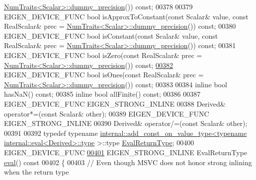 \begin{DoxyCode}
      \hyperlink{group___core___module_struct_eigen_1_1_num_traits}{NumTraits<Scalar>::dummy\_precision}()) \textcolor{keyword}{const};
00378 
00379     EIGEN\_DEVICE\_FUNC \textcolor{keywordtype}{bool} isApproxToConstant(\textcolor{keyword}{const} Scalar& value, \textcolor{keyword}{const} RealScalar& prec = 
      \hyperlink{group___core___module_struct_eigen_1_1_num_traits}{NumTraits<Scalar>::dummy\_precision}()) \textcolor{keyword}{const};
00380     EIGEN\_DEVICE\_FUNC \textcolor{keywordtype}{bool} isConstant(\textcolor{keyword}{const} Scalar& value, \textcolor{keyword}{const} RealScalar& prec = 
      \hyperlink{group___core___module_struct_eigen_1_1_num_traits}{NumTraits<Scalar>::dummy\_precision}()) \textcolor{keyword}{const};
00381     EIGEN\_DEVICE\_FUNC \textcolor{keywordtype}{bool} isZero(\textcolor{keyword}{const} RealScalar& prec = 
      \hyperlink{group___core___module_struct_eigen_1_1_num_traits}{NumTraits<Scalar>::dummy\_precision}()) \textcolor{keyword}{const};
\hyperlink{group___core___module_a8594e26025b86a531561a2476400eed1}{00382}     EIGEN\_DEVICE\_FUNC \textcolor{keywordtype}{bool} isOnes(\textcolor{keyword}{const} RealScalar& prec = 
      \hyperlink{group___core___module_struct_eigen_1_1_num_traits}{NumTraits<Scalar>::dummy\_precision}()) \textcolor{keyword}{const};
00383     
00384     \textcolor{keyword}{inline} \textcolor{keywordtype}{bool} hasNaN() \textcolor{keyword}{const};
00385     \textcolor{keyword}{inline} \textcolor{keywordtype}{bool} allFinite() \textcolor{keyword}{const};
00386 
00387     EIGEN\_DEVICE\_FUNC EIGEN\_STRONG\_INLINE
00388     Derived& operator*=(\textcolor{keyword}{const} Scalar& other);
00389     EIGEN\_DEVICE\_FUNC EIGEN\_STRONG\_INLINE
00390     Derived& operator/=(\textcolor{keyword}{const} Scalar& other);
00391 
00392     \textcolor{keyword}{typedef} \textcolor{keyword}{typename} 
      \hyperlink{struct_eigen_1_1internal_1_1add__const__on__value__type}{internal::add\_const\_on\_value\_type<typename internal::eval<Derived>::type}
      >::type \hyperlink{group___sparse_core___module}{EvalReturnType};
00400     EIGEN\_DEVICE\_FUNC
\hyperlink{group___core___module_a5df64c66228ba75bbc66db2584185527}{00401}     EIGEN\_STRONG\_INLINE EvalReturnType \hyperlink{group___core___module_a5df64c66228ba75bbc66db2584185527}{eval}()\textcolor{keyword}{ const}
00402 \textcolor{keyword}{    }\{
00403       \textcolor{comment}{// Even though MSVC does not honor strong inlining when the return type}

\end{DoxyCode}
